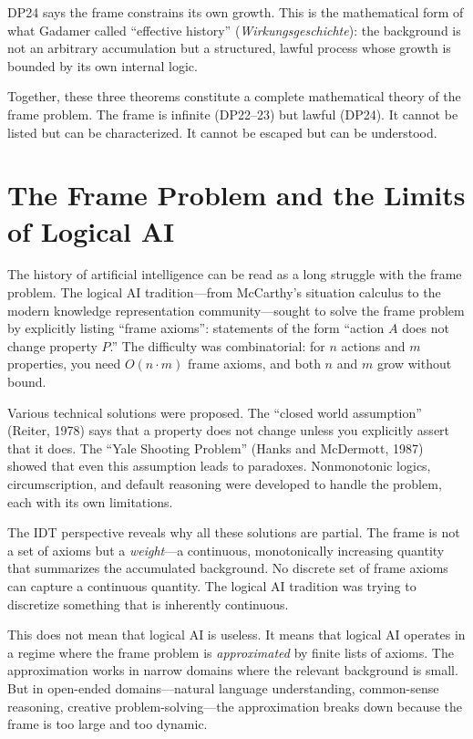 DP24 says the frame constrains its own growth.  This is the mathematical
form of what Gadamer called ``effective history''
(\textit{Wirkungsgeschichte}): the background is not an arbitrary
accumulation but a structured, lawful process whose growth is bounded by
its own internal logic.

Together, these three theorems constitute a complete mathematical
theory of the frame problem.  The frame is infinite (DP22--23) but
lawful (DP24).  It cannot be listed but can be characterized.  It
cannot be escaped but can be understood.

\section{The Frame Problem and the Limits of Logical AI}

The history of artificial intelligence can be read as a long struggle
with the frame problem.  The logical AI tradition---from McCarthy's
situation calculus to the modern knowledge representation
community---sought to solve the frame problem by explicitly listing
``frame axioms'': statements of the form ``action $A$ does not change
property $P$.''  The difficulty was combinatorial: for $n$ actions and
$m$ properties, you need $O(n \cdot m)$ frame axioms, and both $n$
and $m$ grow without bound.

Various technical solutions were proposed.  The ``closed world
assumption'' (Reiter, 1978) says that a property does not change
unless you explicitly assert that it does.  The ``Yale Shooting
Problem'' (Hanks and McDermott, 1987) showed that even this assumption
leads to paradoxes.  Nonmonotonic logics, circumscription, and
default reasoning were developed to handle the problem, each with
its own limitations.

The IDT perspective reveals why all these solutions are partial.
The frame is not a set of axioms but a \emph{weight}---a continuous,
monotonically increasing quantity that summarizes the accumulated
background.  No discrete set of frame axioms can capture a continuous
quantity.  The logical AI tradition was trying to discretize something
that is inherently continuous.

This does not mean that logical AI is useless.  It means that logical AI
operates in a regime where the frame problem is \emph{approximated}
by finite lists of axioms.  The approximation works in narrow domains
where the relevant background is small.  But in open-ended domains---natural
language understanding, common-sense reasoning, creative
problem-solving---the approximation breaks down because the frame is too
large and too dynamic.

